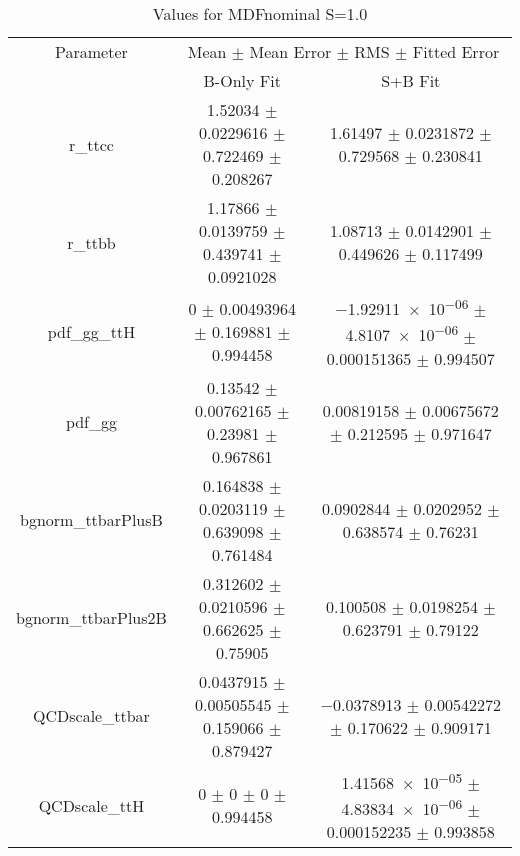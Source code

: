 \begin{table}
\centering
\caption{Values for MDFnominal S=1.0}
\begin{tabular}{ccc}
\toprule
Parameter & \multicolumn{2}{c}{Mean $\pm$ Mean Error $\pm$ RMS $\pm$ Fitted Error}\\
 & B-Only Fit & S+B Fit\\
\midrule
r\_ttcc & \num{1.52034} $\pm$ \num{0.0229616} $\pm$ \num{0.722469} $\pm$ \num{0.208267} & \num{1.61497} $\pm$ \num{0.0231872} $\pm$ \num{0.729568} $\pm$ \num{0.230841}\\
r\_ttbb & \num{1.17866} $\pm$ \num{0.0139759} $\pm$ \num{0.439741} $\pm$ \num{0.0921028} & \num{1.08713} $\pm$ \num{0.0142901} $\pm$ \num{0.449626} $\pm$ \num{0.117499}\\
pdf\_gg\_ttH & \num{0} $\pm$ \num{0.00493964} $\pm$ \num{0.169881} $\pm$ \num{0.994458} & \num{-1.92911e-06} $\pm$ \num{4.8107e-06} $\pm$ \num{0.000151365} $\pm$ \num{0.994507}\\
pdf\_gg & \num{0.13542} $\pm$ \num{0.00762165} $\pm$ \num{0.23981} $\pm$ \num{0.967861} & \num{0.00819158} $\pm$ \num{0.00675672} $\pm$ \num{0.212595} $\pm$ \num{0.971647}\\
bgnorm\_ttbarPlusB & \num{0.164838} $\pm$ \num{0.0203119} $\pm$ \num{0.639098} $\pm$ \num{0.761484} & \num{0.0902844} $\pm$ \num{0.0202952} $\pm$ \num{0.638574} $\pm$ \num{0.76231}\\
bgnorm\_ttbarPlus2B & \num{0.312602} $\pm$ \num{0.0210596} $\pm$ \num{0.662625} $\pm$ \num{0.75905} & \num{0.100508} $\pm$ \num{0.0198254} $\pm$ \num{0.623791} $\pm$ \num{0.79122}\\
QCDscale\_ttbar & \num{0.0437915} $\pm$ \num{0.00505545} $\pm$ \num{0.159066} $\pm$ \num{0.879427} & \num{-0.0378913} $\pm$ \num{0.00542272} $\pm$ \num{0.170622} $\pm$ \num{0.909171}\\
QCDscale\_ttH & \num{0} $\pm$ \num{0} $\pm$ \num{0} $\pm$ \num{0.994458} & \num{1.41568e-05} $\pm$ \num{4.83834e-06} $\pm$ \num{0.000152235} $\pm$ \num{0.993858}\\
\bottomrule
\end{tabular}
\end{table}